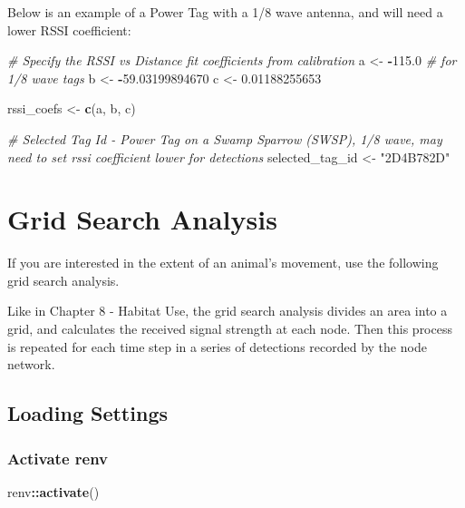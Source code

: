 \documentclass[
]{book}
\newenvironment{Shaded}{\begin{snugshade}}{\end{snugshade}}
\newcommand{\CommentTok}[1]{\textcolor[rgb]{0.56,0.35,0.01}{\textit{#1}}}
\newcommand{\FloatTok}[1]{\textcolor[rgb]{0.00,0.00,0.81}{#1}}
\newcommand{\FunctionTok}[1]{\textcolor[rgb]{0.13,0.29,0.53}{\textbf{#1}}}
\newcommand{\NormalTok}[1]{#1}
\newcommand{\OtherTok}[1]{\textcolor[rgb]{0.56,0.35,0.01}{#1}}
\newcommand{\SpecialCharTok}[1]{\textcolor[rgb]{0.81,0.36,0.00}{\textbf{#1}}}
\newcommand{\StringTok}[1]{\textcolor[rgb]{0.31,0.60,0.02}{#1}}
\begin{document}
Below is an example of a Power Tag with a 1/8 wave antenna, and will need a lower RSSI coefficient:

\begin{Shaded}
\begin{Highlighting}[]
\CommentTok{\# Specify the RSSI vs Distance fit coefficients from calibration}
\NormalTok{a }\OtherTok{\textless{}{-}} \SpecialCharTok{{-}}\FloatTok{115.0} \CommentTok{\# for 1/8 wave tags}
\NormalTok{b }\OtherTok{\textless{}{-}} \SpecialCharTok{{-}}\FloatTok{59.03199894670}
\NormalTok{c }\OtherTok{\textless{}{-}} \FloatTok{0.01188255653}

\NormalTok{rssi\_coefs }\OtherTok{\textless{}{-}} \FunctionTok{c}\NormalTok{(a, b, c)}

\CommentTok{\# Selected Tag Id {-} Power Tag on a Swamp Sparrow (SWSP), 1/8 wave, may need to set rssi coefficient lower for detections}
\NormalTok{selected\_tag\_id }\OtherTok{\textless{}{-}} \StringTok{"2D4B782D"}
\end{Highlighting}
\end{Shaded}

\chapter{Grid Search Analysis}\label{grid-search-analysis}

If you are interested in the extent of an animal's movement, use the following grid search analysis.

Like in Chapter 8 - Habitat Use, the grid search analysis divides an area into a grid, and calculates the received signal strength at each node. Then this process is repeated for each time step in a series of detections recorded by the node network.

\section{Loading Settings}\label{loading-settings}

\subsection{Activate renv}\label{activate-renv-1}

\begin{Shaded}
\begin{Highlighting}[]
\NormalTok{renv}\SpecialCharTok{::}\FunctionTok{activate}\NormalTok{()}
\end{Highlighting}
\end{Shaded}
\end{document}
